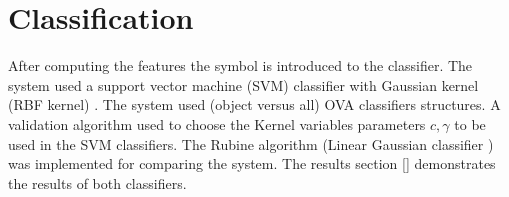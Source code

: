 \section{Classification}%
\label{sec:Classification}
 After computing the features the symbol is introduced to the classifier. The system used a support vector machine (SVM) classifier with Gaussian kernel (RBF kernel) \cite{libsvm}. The system used (object versus all) OVA classifiers structures. A validation algorithm used to choose the Kernel variables parameters  $c,\gamma$ to be used in the SVM classifiers. The Rubine algorithm (Linear Gaussian classifier ) was implemented for comparing the system. The results section \ref{} demonstrates the results of both classifiers. \\%

